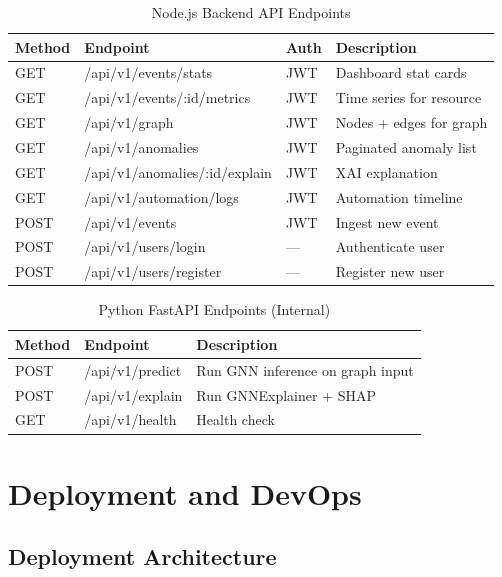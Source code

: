 \documentclass[12pt,a4paper]{report}
\begin{document}
\begin{table}[H]
\centering
\caption{Node.js Backend API Endpoints}
\begin{tabular}{p{1.3cm} p{5.5cm} p{1cm} p{5cm}}
\toprule
\textbf{Method} & \textbf{Endpoint} & \textbf{Auth} &
\textbf{Description} \\
\midrule
GET  & /api/v1/events/stats           & JWT & Dashboard stat cards \\
GET  & /api/v1/events/:id/metrics     & JWT & Time series for resource \\
GET  & /api/v1/graph                  & JWT & Nodes + edges for graph \\
GET  & /api/v1/anomalies              & JWT & Paginated anomaly list \\
GET  & /api/v1/anomalies/:id/explain  & JWT & XAI explanation \\
GET  & /api/v1/automation/logs        & JWT & Automation timeline \\
POST & /api/v1/events                 & JWT & Ingest new event \\
POST & /api/v1/users/login            & ---   & Authenticate user \\
POST & /api/v1/users/register         & ---   & Register new user \\
\bottomrule
\end{tabular}
\end{table}

\begin{table}[H]
\centering
\caption{Python FastAPI Endpoints (Internal)}
\begin{tabular}{lll}
\toprule
\textbf{Method} & \textbf{Endpoint} & \textbf{Description} \\
\midrule
POST & /api/v1/predict & Run GNN inference on graph input \\
POST & /api/v1/explain & Run GNNExplainer + SHAP \\
GET  & /api/v1/health  & Health check \\
\bottomrule
\end{tabular}
\end{table}

\chapter{Deployment and DevOps}

\section{Deployment Architecture}
\end{document}
